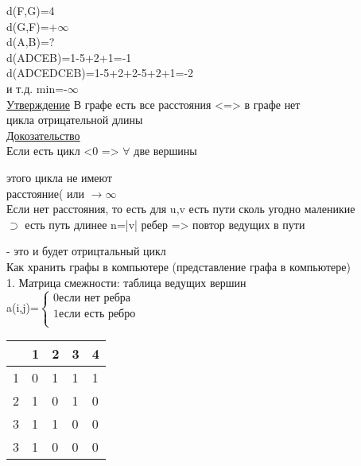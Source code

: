 \documentclass{article}
\begin{document}
d(F,G)=4\\
d(G,F)=+$\infty$\\
d(A,B)=?\\
d(ADCEB)=1-5+2+1=-1\\
d(ADCEDCEB)=1-5+2+2-5+2+1=-2\\
и т.д. min=-$\infty$\\
\underline{Утверждение} В графе есть все расстояния <=> в графе нет\\
цикла отрицательной длины\\
\underline{Докозательство}\\
Если есть цикл <0 => $\forall$ две вершины
этого цикла не имеют\\
расстояние( или $\rightarrow \infty$\\
Если нет расстояния, то есть для u,v есть пути сколь угодно маленикие\\
$\supset$ есть путь длинее n=|v| ребер => повтор ведущих в пути\\
- это и будет отрицтальный цикл\\
Как хранить графы в компьютере (представление графа в компьютере)\\
1. Матрица смежности: таблица ведущих вершин\\
a(i,j)=$
\left\{
\begin{array}{rcll}
0 \textrm{если нет ребра}\\
1 \textrm{если есть ребро}\\
\end{array}
\right.
$\\
\begin{tabular}{l|l l l l|}
 & 1 & 2& 3 & 4\\
\hline
1 & 0 & 1 & 1 & 1\\
2 & 1 & 0& 1&0 \\
3& 1&1&0&0\\
3& 1&0&0&0\\
\hline
\end{tabular}\\
\end{document}
